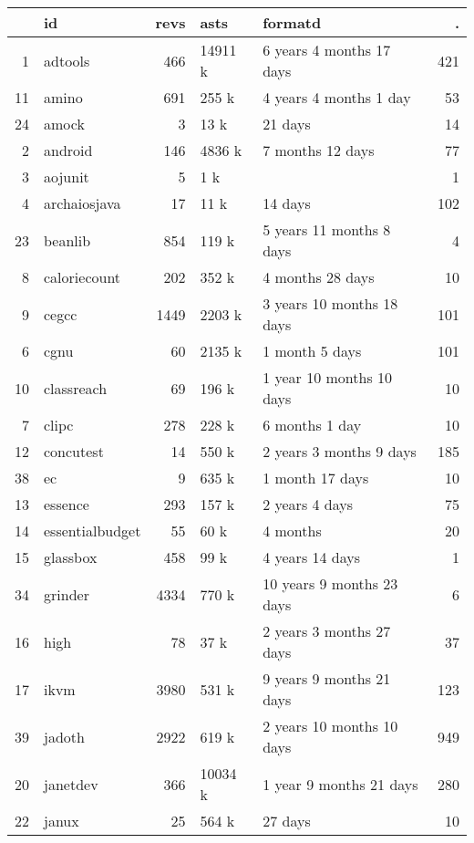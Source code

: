 \begin{table}[ht]
\centering
\begin{tabular}{rlrllr}
  \hline
 & id & revs & asts & formatd & . \\ 
  \hline
1 & adtools & 466 & 14911 k & 6 years 4 months 17 days & 421 \\ 
  11 & amino & 691 & 255 k & 4 years 4 months 1 day &  53 \\ 
  24 & amock &   3 & 13 k &  21 days &  14 \\ 
  2 & android & 146 & 4836 k &  7 months 12 days &  77 \\ 
  3 & aojunit &   5 & 1 k &  &   1 \\ 
  4 & archaiosjava &  17 & 11 k &  14 days & 102 \\ 
  23 & beanlib & 854 & 119 k & 5 years 11 months 8 days &   4 \\ 
  8 & caloriecount & 202 & 352 k &  4 months 28 days &  10 \\ 
  9 & cegcc & 1449 & 2203 k & 3 years 10 months 18 days & 101 \\ 
  6 & cgnu &  60 & 2135 k &  1 month 5 days & 101 \\ 
  10 & classreach &  69 & 196 k &  1 year 10 months 10 days &  10 \\ 
  7 & clipc & 278 & 228 k &  6 months 1 day &  10 \\ 
  12 & concutest &  14 & 550 k & 2 years 3 months 9 days & 185 \\ 
  38 & ec &   9 & 635 k &  1 month 17 days &  10 \\ 
  13 & essence & 293 & 157 k & 2 years 4 days &  75 \\ 
  14 & essentialbudget &  55 & 60 k &  4 months &  20 \\ 
  15 & glassbox & 458 & 99 k & 4 years 14 days &   1 \\ 
  34 & grinder & 4334 & 770 k & 10 years 9 months 23 days &   6 \\ 
  16 & high &  78 & 37 k & 2 years 3 months 27 days &  37 \\ 
  17 & ikvm & 3980 & 531 k & 9 years 9 months 21 days & 123 \\ 
  39 & jadoth & 2922 & 619 k & 2 years 10 months 10 days & 949 \\ 
  20 & janetdev & 366 & 10034 k &  1 year 9 months 21 days & 280 \\ 
  22 & janux &  25 & 564 k &  27 days &  10 \\ 

\end{tabular}
\end{table}

